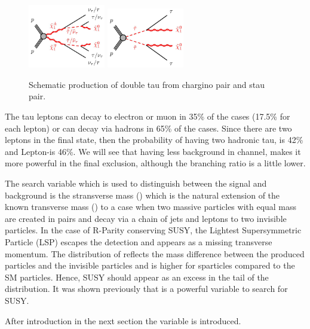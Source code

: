\begin{figure}[!htb]
\centering
\includegraphics[width=0.3\textwidth]{Introductionfigs/DiChargino.png}
\includegraphics[width=0.3\textwidth]{Introductionfigs/DiSTau.png}
\caption{Schematic production of double tau from chargino pair and stau pair.}
\label{fig:Productions}
\end{figure}

The tau leptons can decay to electron or muon in 35\% of the cases (17.5\% for each lepton) 
or can decay via hadrons in 65\% of the cases. Since there are two leptons in the final state, then the probability of having 
two hadronic tau, \tauTau is 42\% and Lepton-\Tau is 46\%. We will see that having less background in \tauTau channel, makes it more powerful
in the final exclusion, although the branching ratio is a little lower.

The search variable which is used to distinguish between the signal and background is the stransverse mass (\mttwo) 
which is the natural extension of the known transverse mass (\mt) to a case 
when two massive particles with equal mass are created in pairs and decay via a chain of jets and leptons to two 
invisible particles. 
In the case of R-Parity conserving SUSY, the Lightest Supersymmetric Particle (LSP) escapes the detection and appears as 
a missing transverse momentum.
The distribution of \mttwo reflects the mass difference between the produced particles and the invisible  particles and is higher for sparticles
compared to the SM particles. Hence, SUSY should appear as an excess in the tail of the \mttwo distribution.
It was shown previously \cite{Chatrchyan:2012jx} that \mttwo is a powerful variable to search for SUSY. 




After introduction in the next section the \mttwo variable is introduced. 




